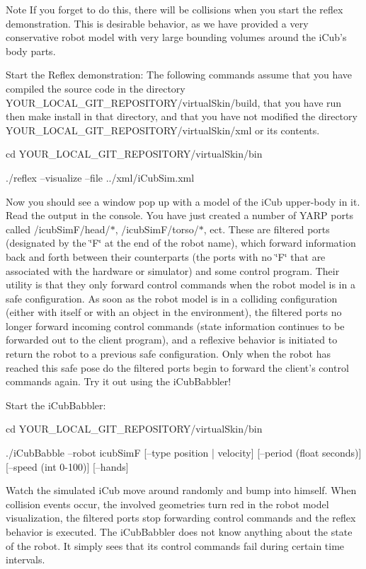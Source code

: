 \begin{DoxyNote}{Note}
If you forget to do this, there will be collisions when you start the reflex demonstration. This is desirable behavior, as we have provided a very conservative robot model with very large bounding volumes around the iCub's body parts.
\end{DoxyNote}
Start the Reflex demonstration: The following commands assume that you have compiled the source code in the directory {\ttfamily YOUR\_\-LOCAL\_\-GIT\_\-REPOSITORY/virtualSkin/build}, that you have run  then {\ttfamily make} {\ttfamily install} in that directory, and that you have not modified the directory {\ttfamily YOUR\_\-LOCAL\_\-GIT\_\-REPOSITORY/virtualSkin/xml} or its contents. \begin{DoxyVerb}cd YOUR_LOCAL_GIT_REPOSITORY/virtualSkin/bin \end{DoxyVerb}
 \begin{DoxyVerb}./reflex --visualize --file ../xml/iCubSim.xml \end{DoxyVerb}
 Now you should see a window pop up with a model of the iCub upper-\/body in it. Read the output in the console. You have just created a number of YARP ports called {\ttfamily /icubSimF/head/$\ast$}, {\ttfamily /icubSimF/torso/$\ast$}, ect. These are filtered ports (designated by the \char`\"{}F\char`\"{} at the end of the robot name), which forward information back and forth between their counterparts (the ports with no \char`\"{}F\char`\"{} that are associated with the hardware or simulator) and some control program. Their utility is that they only forward control commands when the robot model is in a safe configuration. As soon as the robot model is in a colliding configuration (either with itself or with an object in the environment), the filtered ports no longer forward incoming control commands (state information continues to be forwarded out to the client program), and a reflexive behavior is initiated to return the robot to a previous safe configuration. Only when the robot has reached this safe pose do the filtered ports begin to forward the client's control commands again. Try it out using the iCubBabbler!

Start the iCubBabbler: \begin{DoxyVerb}cd YOUR_LOCAL_GIT_REPOSITORY/virtualSkin/bin \end{DoxyVerb}
 \begin{DoxyVerb}./iCubBabble --robot icubSimF [--type position | velocity] [--period (float seconds)] [--speed (int 0-100)] [--hands] \end{DoxyVerb}
 Watch the simulated iCub move around randomly and bump into himself. When collision events occur, the involved geometries turn red in the robot model visualization, the filtered ports stop forwarding control commands and the reflex behavior is executed. The iCubBabbler does not know anything about the state of the robot. It simply sees that its control commands fail during certain time intervals.

